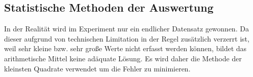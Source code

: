 \subsection{Statistische Methoden der Auswertung}
In der Realität wird im Experiment nur ein endlicher Datensatz gewonnen. Da dieser aufgrund von technischen Limitation in der Regel zusätzlich verzerrt ist, weil sehr kleine bzw. sehr große Werte nicht erfasst werden können, bildet das arithmetische Mittel keine adäquate Lösung. Es wird daher die Methode der kleinsten Quadrate verwendet um die Fehler zu minimieren.